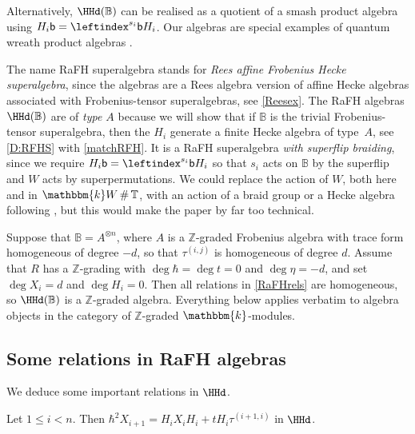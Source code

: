 \documentclass[a4paper,11pt]{amsart}
\numberwithin{equation}{subsection}
\theoremstyle{definition}
\theoremstyle{theorem}
\theoremstyle{remark}
\newcommand\Sym{W}
\newcommand\bb{\mathsf{b}}
\newcommand\taui[1][i]{\tau^{(#1)}}
\newcommand\kk{\mathbbm{k}}
\newcommand\RR{R}
\newcommand\Z{\mathbb{Z}}
\newcommand\Tos{\mathbb{T}}
\newcommand{\Bo}{\mathbb{B}}
\DeclareMathOperator\Smash{\#}
\begin{document}
  \begin{Remark} Alternatively, $\HHd(\Bo)$ can be realised as a
    quotient of a smash product algebra using $H_i\bb = \leftindex^{s_i}\bb H_i$. Our algebras are special examples of quantum wreath product algebras \cite{CJNakanoXiang,LaiMinets}.
  \end{Remark}

   \begin{Remark}\label{flipbraiding}
    The name RaFH superalgebra stands for \emph{Rees affine Frobenius Hecke superalgebra},
    since the algebras are a Rees algebra version of affine Hecke
    algebras associated with Frobenius-tensor superalgebras, see \autoref{Reesex}.
     The RaFH
    algebras $\HHd(\Bo)$ are of \textit{type $A$} because we will show
    that if $\Bo$ is the trivial Frobenius-tensor superalgebra, then
    the $H_i$ generate a finite Hecke algebra of type~$A$, see \autoref{D:RFHS} with \autoref{matchRFH}. It is a RaFH superalgebra
    \emph{with superflip braiding}, since we require
    $H_i\bb = \leftindex^{s_i}\bb H_i$ so that $s_i$ acts on $\Bo$ by the superflip and $\Sym$ acts by superpermutations.
    We could  replace the action of $\Sym$, both here and
    in $\kk\Sym\Smash\Tos$, with an action of a braid group or a Hecke
    algebra following  \cite{CJNakanoXiang,LaiMinets,MinetsYBE}, but this would make the paper by far too technical.
      \end{Remark}
      \begin{Remark}\label{Rk:Zgraded}
  Suppose that $\Bo=A^{\otimes n}$, where $A$ is a $\Z$-graded Frobenius algebra with trace form homogeneous of degree $-d$,
  so that $\taui[i,j]$ is homogeneous of degree $d$. Assume that $\RR$ has a $\Z$-grading with
  $\deg\hbar=\deg t=0$ and $\deg\eta=-d$, and set $\deg X_i=d$ and
  $\deg H_i=0$. Then all relations in \autoref{RaFHrels} are homogeneous, so
  $\HHd(\Bo)$ is a $\Z$-graded algebra. Everything below applies verbatim to
  algebra objects in the category of $\Z$-graded $\kk$-modules.
\end{Remark}

      \subsection{Some relations in RaFH algebras}We deduce some important relations in $\HHd$.\label{S:somerelations}
\begin{Lemma}\label{L:HXH}
  Let $1\le i<n$. Then
  $\hbar^2 X_{i+1}=H_iX_iH_i +t H_i\tau^{(i+1,i)}$ in $\HHd$.
\end{Lemma}
\end{document}
